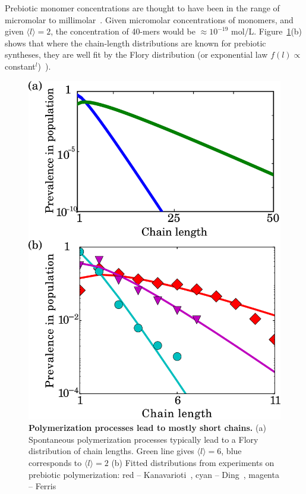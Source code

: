 \documentclass[twocolumn,letterpaper]{revtex4-1}
\begin{document}
 Prebiotic monomer concentrations are thought to have been in the range of micromolar to 
millimolar~\cite{Stribling1987,Huber1998,Aubrey2009,Kanavarioti2001,Lazcano1996}.  Given micromolar 
concentrations of monomers, and given $\langle l \rangle = 2$, the concentration of 40-mers would 
be $\approx 10^{-19} $ mol/L.  Figure~\ref{fig:flory}(b) shows that where the chain-length 
distributions are known for prebiotic syntheses, they are well fit by the Flory 
distribution (or exponential law $f(l)\propto$ 
constant$^l$)~\cite{nowak2008prevolutionary,Derr2012}).


\begin{figure}[ht!]
  \centering
  \includegraphics[width=0.9\columnwidth]{pictures/flory-two.eps} 
  \caption{\textbf{Polymerization processes lead to mostly short chains.} (a)  Spontaneous 
polymerization processes typically lead to a Flory distribution of chain lengths. 
Green line gives $\langle  l \rangle= 6$, blue corresponds to $\langle l \rangle=2$
(b) Fitted distributions from experiments on prebiotic polymerization: red -- 
Kanavarioti~\cite{Kanavarioti2001}, cyan -- Ding~\cite{Ding1996}, 
magenta -- Ferris~\cite{Ferris1999}}
  \label{fig:flory}
\end{figure}
\end{document}
